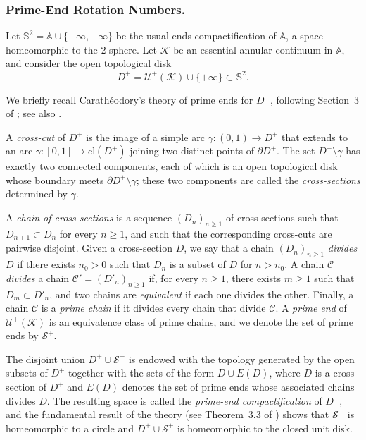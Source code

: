 \documentclass[12pt,a4paper]{amsart}
\theoremstyle{definition}
\theoremstyle{remark}
\newcommand{\A}{\mathbb{A}}
\begin{document}
\subsubsection{Prime-End Rotation Numbers.}
Let $\mathbb{S}^2=\A\cup\{-\infty,+\infty\}$ be the usual ends-compactification of $\A$, a space homeomorphic to the $2$-sphere. Let $\mathcal{K}$ be an essential annular continuum in $\A$, and consider the open topological disk
$$D^+=\mathcal{U}^{+}(\mathcal{K})\cup\{+\infty\}\subset \mathbb{S}^2.$$
{\color{black} We briefly recall Carath\'eodory's theory of prime ends for $D^+$, following Section~3 of \cite{korolena}; see also \cite{Caratheodory}.
 
A \emph{cross-cut} of $D^+$ is the image of a simple arc $\gamma:(0,1)\to D^+$ that extends to an arc $\overline{\gamma}:[0,1]\to \mathrm{cl}(D^+)$ joining two distinct points of $\partial D^+$. The set $D^+\setminus\gamma$ has exactly two connected components, each of which is an open topological disk whose boundary meets $\partial D^+\setminus\overline{\gamma}$; these two components are called the \emph{cross-sections} determined by $\gamma$. 

A \emph{chain of cross-sections} is a sequence $(D_n)_{n\geq 1}$ of cross-sections such that $D_{n+1}\subset D_n$ for every $n\geq 1$, and such that the corresponding cross-cuts are pairwise disjoint. Given a cross-section $D$, we say that a chain $(D_n)_{n\geq 1}$ \emph{divides} $D$ if there exists $n_0>0$ such that $D_n$ is a subset of $ D$ for $n>n_0$. A chain $\mathcal{C}$ \emph{divides} a chain $\mathcal{C}'=(D'_n)_{n\geq 1}$ if, for every $n\geq 1$, there exists $m\geq 1$ such that $D_m\subset D'_n$, and two chains are \emph{equivalent} if each one divides the other. Finally, a chain $\mathcal{C}$ is a \emph{prime chain} if it divides every chain that divide $\mathcal{C}$. A \emph{prime end} of $\mathcal{U}^{+}(\mathcal{K})$ is an equivalence class of prime chains, and we denote the set of prime ends by $\mathcal{S}^+$.
 
The disjoint union $D^+\cup\mathcal{S}^+$ is endowed with the topology generated by the open subsets of $D^+$ together with the sets of the form $D\cup E(D)$, where $D$ is a cross-section of $D^+$ and $E(D)$ denotes the set of prime ends whose associated chains divides $D$. The resulting space is called the \emph{prime-end compactification} of $D^+$, and the fundamental result of the theory (see Theorem~3.3 of \cite{korolena}) shows that $\mathcal{S}^+$ is homeomorphic to a circle and $D^+\cup\mathcal{S}^+$ is homeomorphic to the closed unit disk.
 
}
\end{document}
